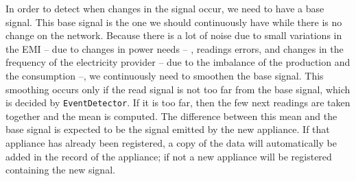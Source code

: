 In order to detect when changes in the signal occur, we need to have a base signal. This base signal is the one we should continuously have while there is no change on the network. Because there is a lot of noise due to small variations in the EMI -- due to changes in power needs -- , readings errors, and changes in the frequency of the electricity provider -- due to the imbalance of the production and the consumption --, we continuously need to smoothen the base signal. This smoothing occurs only if the read signal is not too far from the base signal, which is decided by \texttt{EventDetector}. If it is too far, then the few next readings are taken together and the mean is computed. The difference between this mean and the base signal is expected to be the signal emitted by the new appliance. If that appliance has already been registered, a copy of the data will automatically be added in the record of the appliance; if not a new appliance will be registered containing the new signal.



